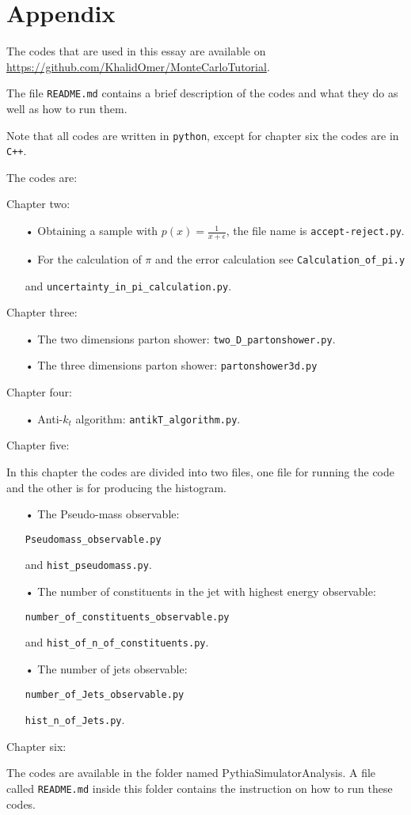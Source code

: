 \chapter*{Appendix}

The codes that are used in this essay are available on \url{https://github.com/KhalidOmer/MonteCarloTutorial}. 

The file \verb+README.md+ contains a brief description of the codes and what they do as well as how to run them.

Note that all codes are written in \verb+python+, except for chapter six the codes are in \verb!C++!.

The codes are:

Chapter two:
\begin{itemize}
\item[•] Obtaining a sample with $p(x) = \frac{1}{x+\epsilon}$, the file name is \verb+accept-reject.py+.
\item[•] For the calculation of $\pi$ and the error calculation see \verb+Calculation_of_pi.y+ 

and \verb+uncertainty_in_pi_calculation.py+.
\end{itemize}  
Chapter three:
\begin{itemize}
\item[•]The two dimensions parton shower: \verb+two_D_partonshower.py+. 
\item[•]The three dimensions parton shower: \verb+partonshower3d.py+ 
\end{itemize}
Chapter four:
\begin{itemize}
\item[•] Anti-$k_t$ algorithm: \verb+antikT_algorithm.py+.
\end{itemize}
Chapter five:

In this chapter the codes are divided into two files,  one file for running the code and the other is for producing the histogram.   
\begin{itemize}
\item[•] The Pseudo-mass observable:

\verb+Pseudomass_observable.py+ 

and \verb+hist_pseudomass.py+.
\item[•] The number of constituents in the jet with highest energy observable: 

\verb+number_of_constituents_observable.py+ 

and \verb+hist_of_n_of_constituents.py+.
\item[•] The number of jets observable:

\verb+number_of_Jets_observable.py+

\verb+hist_n_of_Jets.py+.
\end{itemize}
Chapter six:

The codes are available in the folder named PythiaSimulatorAnalysis. A file called \verb+README.md+ inside this folder contains the instruction on how to run these codes.  
